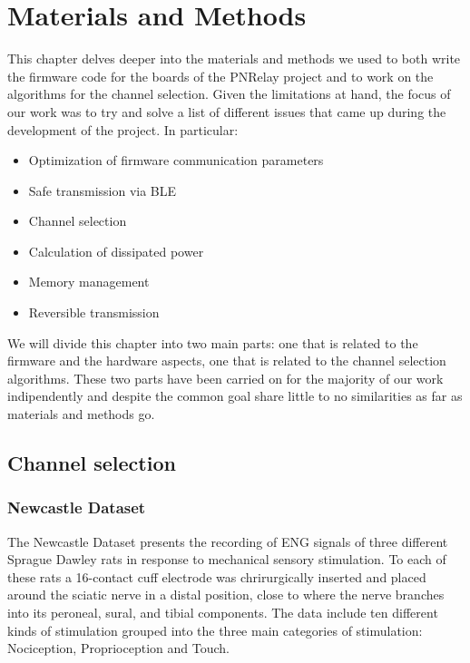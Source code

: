 \documentclass{Configuration_Files/PoliMi3i_thesis}
\begin{document}
\chapter{Materials and Methods}
This chapter delves deeper into the materials and methods we used to both write the firmware code for the boards of the PNRelay project and to work on the algorithms for the channel selection.
Given the limitations at hand, the focus of our work was to try and solve a list of different issues that came up during the development of the project.
In particular:

\begin{itemize}
	\item Optimization of firmware communication parameters
	\item Safe transmission via BLE
	\item Channel selection
	\item Calculation of dissipated power
	\item Memory management
	\item Reversible transmission
\end{itemize}

We will divide this chapter into two main parts: one that is related to the firmware and the hardware aspects, one that is related to the channel selection algorithms.
These two parts have been carried on for the majority of our work indipendently and despite the common goal share little to no similarities as far as materials and methods go.

\section{Channel selection}

\subsection{Newcastle Dataset}

The Newcastle Dataset presents the recording of ENG signals of three different Sprague Dawley rats in response to mechanical sensory stimulation.
To each of these rats a 16-contact cuff electrode was chrirurgically inserted and placed around the sciatic nerve in a distal position, close to where the nerve branches into its peroneal, sural, and tibial components.
The data include ten different kinds of stimulation grouped into the three main categories of stimulation: Nociception, Proprioception and Touch.
\end{document}
